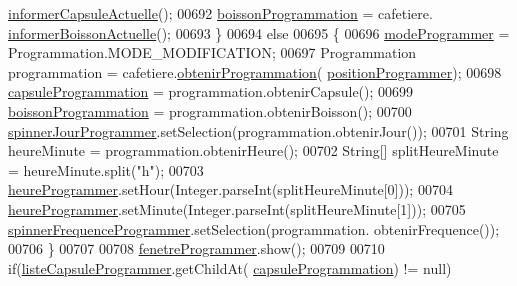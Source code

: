 \begin{DoxyCode}
      \hyperlink{classcom_1_1example_1_1ekawa_1_1_cafetiere_a3251d1865f3a4113553e1743a971984d}{informerCapsuleActuelle}();
00692                     \hyperlink{classcom_1_1example_1_1ekawa_1_1_ihm_a6ad8136ec35fff9e96476c4f35726fea}{boissonProgrammation} = cafetiere.
      \hyperlink{classcom_1_1example_1_1ekawa_1_1_cafetiere_aa7022512d5a36d2b911722ae6400379f}{informerBoissonActuelle}();
00693                 \}
00694                 \textcolor{keywordflow}{else}
00695                 \{
00696                     \hyperlink{classcom_1_1example_1_1ekawa_1_1_ihm_acc8db4ba4fa39c343412d6ff57c2acbd}{modeProgrammer} = Programmation.MODE\_MODIFICATION;
00697                     Programmation programmation = cafetiere.\hyperlink{classcom_1_1example_1_1ekawa_1_1_cafetiere_aaaaa95b5ed36da9d14f5aa60116a66b8}{obtenirProgrammation}(
      \hyperlink{classcom_1_1example_1_1ekawa_1_1_ihm_ada29cde0c67d8614d47b27ed04c337e9}{positionProgrammer});
00698                     \hyperlink{classcom_1_1example_1_1ekawa_1_1_ihm_a2ddf5b95e2a3fbb3a15d160ba266295a}{capsuleProgrammation} = programmation.obtenirCapsule();
00699                     \hyperlink{classcom_1_1example_1_1ekawa_1_1_ihm_a6ad8136ec35fff9e96476c4f35726fea}{boissonProgrammation} = programmation.obtenirBoisson();
00700                     \hyperlink{classcom_1_1example_1_1ekawa_1_1_ihm_a49e6261929f259b2fcc81bf13d21ad7f}{spinnerJourProgrammer}.setSelection(programmation.obtenirJour());
00701                     String heureMinute = programmation.obtenirHeure();
00702                     String[] splitHeureMinute = heureMinute.split(\textcolor{stringliteral}{"h"});
00703                     \hyperlink{classcom_1_1example_1_1ekawa_1_1_ihm_ac6f46062030a20efac18673970d37547}{heureProgrammer}.setHour(Integer.parseInt(splitHeureMinute[0]));
00704                     \hyperlink{classcom_1_1example_1_1ekawa_1_1_ihm_ac6f46062030a20efac18673970d37547}{heureProgrammer}.setMinute(Integer.parseInt(splitHeureMinute[1]));
00705                     \hyperlink{classcom_1_1example_1_1ekawa_1_1_ihm_ab266576a3855dbd6e36e346ddb27247a}{spinnerFrequenceProgrammer}.setSelection(programmation.
      obtenirFrequence());
00706                 \}
00707 
00708                 \hyperlink{classcom_1_1example_1_1ekawa_1_1_ihm_addac9c5f93086d06e5131cd42f3be941}{fenetreProgrammer}.show();
00709 
00710                 \textcolor{keywordflow}{if}(\hyperlink{classcom_1_1example_1_1ekawa_1_1_ihm_adfeb58df0ce9fa2088a7a708a54ffe07}{listeCapsuleProgrammer}.getChildAt(
      \hyperlink{classcom_1_1example_1_1ekawa_1_1_ihm_a2ddf5b95e2a3fbb3a15d160ba266295a}{capsuleProgrammation}) != null)

\end{DoxyCode}
